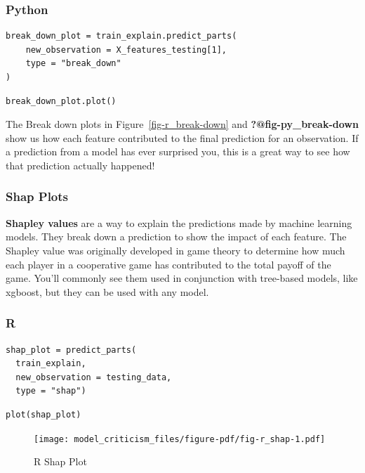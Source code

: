 \documentclass[
  letterpaper,
]{krantz}
\begin{document}
\subsubsection{Python}

\begin{verbatim}
break_down_plot = train_explain.predict_parts(
    new_observation = X_features_testing[1],
    type = "break_down"
)
\end{verbatim}

\begin{verbatim}
break_down_plot.plot()
\end{verbatim}

The Break down plots in Figure~\ref{fig-r_break-down} and
\textbf{?@fig-py\_break-down} show us how each feature contributed to
the final prediction for an observation. If a prediction from a model
has ever surprised you, this is a great way to see how that prediction
actually happened!

\subsubsection{Shap Plots}\label{shap-plots}

\textbf{Shapley values} are a way to explain the predictions made by
machine learning models. They break down a prediction to show the impact
of each feature. The Shapley value was originally developed in game
theory to determine how much each player in a cooperative game has
contributed to the total payoff of the game. You'll commonly see them
used in conjunction with tree-based models, like xgboost, but they can
be used with any model.

\subsubsection{R}

\begin{verbatim}
shap_plot = predict_parts(
  train_explain, 
  new_observation = testing_data, 
  type = "shap")
\end{verbatim}

\begin{verbatim}
plot(shap_plot)
\end{verbatim}

\begin{figure}[H]

{\centering \texttt{[image: model\_criticism\_files/figure-pdf/fig-r\_shap-1.pdf]}

}

\caption{\label{fig-r_shap}R Shap Plot}

\end{figure}
\end{document}
